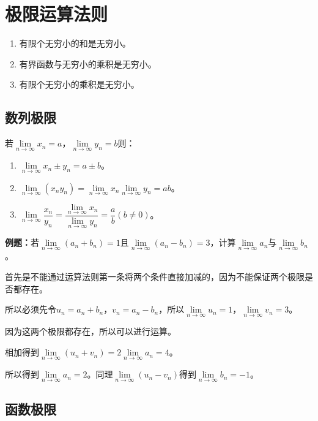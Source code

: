 \documentclass[UTF8, 12pt]{ctexart}
\begin{document}
    \section{极限运算法则}

    \begin{enumerate}
        \item 有限个无穷小的和是无穷小。
        \item 有界函数与无穷小的乘积是无穷小。
        \item 有限个无穷小的乘积是无穷小。
    \end{enumerate}

    \subsection{数列极限}

    若$\lim\limits_{n\to\infty}x_n=a$，$\lim\limits_{n\to\infty}y_n=b$则：

    \begin{enumerate}
        \item $\lim\limits_{n\to\infty}x_n\pm y_n=a\pm b$。
        \item $\lim\limits_{n\to\infty}(x_ny_n)=\lim\limits_{n\to\infty}x_n\lim\limits_{n\to\infty}y_n=ab$。
        \item $\lim\limits_{n\to\infty}\dfrac{x_n}{y_n}=\dfrac{\lim\limits_{n\to\infty}x_n}{\lim\limits_{n\to\infty}y_n}=\dfrac{a}{b}(b\neq 0)$。
    \end{enumerate}

    \textbf{例题：}若$\lim\limits_{n\to\infty}(a_n+b_n)=1$且$\lim\limits_{n\to\infty}(a_n-b_n)=3$，计算$\lim\limits_{n\to\infty}a_n$与$\lim\limits_{n\to\infty}b_n$。

    首先是不能通过运算法则第一条将两个条件直接加减的，因为不能保证两个极限是否都存在。

    所以必须先令$u_n=a_n+b_n$，$v_n=a_n-b_n$，所以$\lim\limits_{n\to\infty}u_n=1$，$\lim\limits_{n\to\infty}v_n=3$。

    因为这两个极限都存在，所以可以进行运算。

    相加得到$\lim\limits_{n\to\infty}(u_n+v_n)=2\lim\limits_{n\to\infty}a_n=4$。

    所以得到$\lim\limits_{n\to\infty}a_n=2$。同理$\lim\limits_{n\to\infty}(u_n-v_n)$得到$\lim\limits_{n\to\infty}b_n=-1$。

    \subsection{函数极限}
\end{document}
